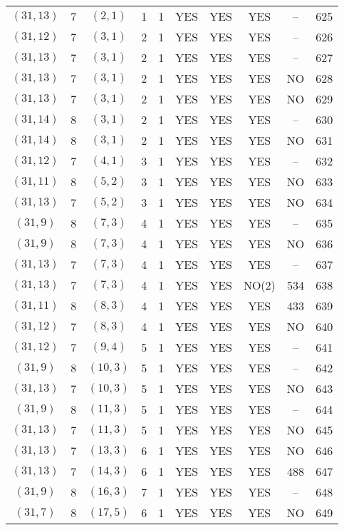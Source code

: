 \begin{longtable}{|c|c|c|c|c|c|c|c|c|c|}
$(31, 13)$ & 7 & $(2, 1)$ & 1 & 1 & YES & YES & YES & -- & 625\\
$(31, 12)$ & 7 & $(3, 1)$ & 2 & 1 & YES & YES & YES & -- & 626\\
$(31, 13)$ & 7 & $(3, 1)$ & 2 & 1 & YES & YES & YES & -- & 627\\
$(31, 13)$ & 7 & $(3, 1)$ & 2 & 1 & YES & YES & YES & NO & 628\\
$(31, 13)$ & 7 & $(3, 1)$ & 2 & 1 & YES & YES & YES & NO & 629\\
$(31, 14)$ & 8 & $(3, 1)$ & 2 & 1 & YES & YES & YES & -- & 630\\
$(31, 14)$ & 8 & $(3, 1)$ & 2 & 1 & YES & YES & YES & NO & 631\\
$(31, 12)$ & 7 & $(4, 1)$ & 3 & 1 & YES & YES & YES & -- & 632\\
$(31, 11)$ & 8 & $(5, 2)$ & 3 & 1 & YES & YES & YES & NO & 633\\
$(31, 13)$ & 7 & $(5, 2)$ & 3 & 1 & YES & YES & YES & NO & 634\\
$(31, 9)$ & 8 & $(7, 3)$ & 4 & 1 & YES & YES & YES & -- & 635\\
$(31, 9)$ & 8 & $(7, 3)$ & 4 & 1 & YES & YES & YES & NO & 636\\
$(31, 13)$ & 7 & $(7, 3)$ & 4 & 1 & YES & YES & YES & -- & 637\\
$(31, 13)$ & 7 & $(7, 3)$ & 4 & 1 & YES & YES & NO(2) & 534 & 638\\
$(31, 11)$ & 8 & $(8, 3)$ & 4 & 1 & YES & YES & YES & 433 & 639\\
$(31, 12)$ & 7 & $(8, 3)$ & 4 & 1 & YES & YES & YES & NO & 640\\
$(31, 12)$ & 7 & $(9, 4)$ & 5 & 1 & YES & YES & YES & -- & 641\\
$(31, 9)$ & 8 & $(10, 3)$ & 5 & 1 & YES & YES & YES & -- & 642\\
$(31, 13)$ & 7 & $(10, 3)$ & 5 & 1 & YES & YES & YES & NO & 643\\
$(31, 9)$ & 8 & $(11, 3)$ & 5 & 1 & YES & YES & YES & -- & 644\\
$(31, 13)$ & 7 & $(11, 3)$ & 5 & 1 & YES & YES & YES & NO & 645\\
$(31, 13)$ & 7 & $(13, 3)$ & 6 & 1 & YES & YES & YES & NO & 646\\
$(31, 13)$ & 7 & $(14, 3)$ & 6 & 1 & YES & YES & YES & 488 & 647\\
$(31, 9)$ & 8 & $(16, 3)$ & 7 & 1 & YES & YES & YES & -- & 648\\
$(31, 7)$ & 8 & $(17, 5)$ & 6 & 1 & YES & YES & YES & NO & 649\\

\end{longtable}
